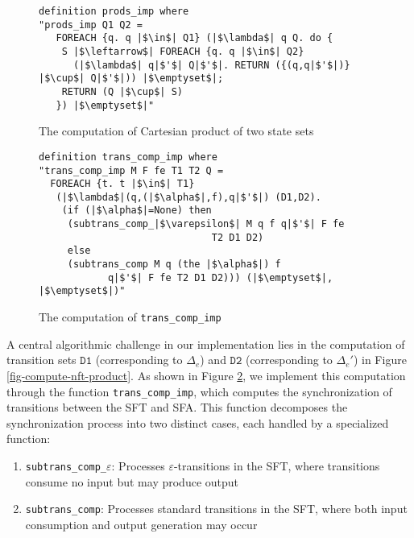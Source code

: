 \begin{figure}[hbt!]
	\begin{lstlisting}
definition prods_imp where
"prods_imp Q1 Q2 =
   FOREACH {q. q |$\in$| Q1} (|$\lambda$| q Q. do {
    S |$\leftarrow$| FOREACH {q. q |$\in$| Q2}
      (|$\lambda$| q|$'$| Q|$'$|. RETURN ({(q,q|$'$|)} |$\cup$| Q|$'$|)) |$\emptyset$|;
    RETURN (Q |$\cup$| S)
   }) |$\emptyset$|"
\end{lstlisting}
\caption{The computation of Cartesian product of two state sets}
\label{fig-def-prods_imp}
\end{figure}



\begin{figure}[hbt!]
	\begin{lstlisting}
definition trans_comp_imp where
"trans_comp_imp M F fe T1 T2 Q =
  FOREACH {t. t |$\in$| T1}
   (|$\lambda$|(q,(|$\alpha$|,f),q|$'$|) (D1,D2). 
    (if (|$\alpha$|=None) then 
     (subtrans_comp_|$\varepsilon$| M q f q|$'$| F fe 
                              T2 D1 D2)
     else
     (subtrans_comp M q (the |$\alpha$|) f 
            q|$'$| F fe T2 D1 D2))) (|$\emptyset$|, |$\emptyset$|)"
\end{lstlisting}
\caption{The computation of \texttt{trans\_comp\_imp}}
\label{fig-def-prods-imp}
\end{figure}

A central algorithmic challenge in our implementation lies in the computation of transition sets $\texttt{D1}$ (corresponding to $\Delta_e$) and $\texttt{D2}$ (corresponding to $\Delta_e'$) in Figure \ref{fig-compute-nft-product}. As shown in Figure \ref{fig-def-prods-imp}, we implement this computation through the function \texttt{trans\_comp\_imp}, which computes the synchronization of transitions between the SFT and SFA. This function decomposes the synchronization process into two distinct cases, each handled by a specialized function:

\begin{enumerate}
  \item \texttt{subtrans\_comp\_$\varepsilon$}: Processes $\varepsilon$-transitions in the SFT, where transitions consume no input but may produce output
  \item \texttt{subtrans\_comp}: Processes standard transitions in the SFT, where both input consumption and output generation may occur
\end{enumerate}




